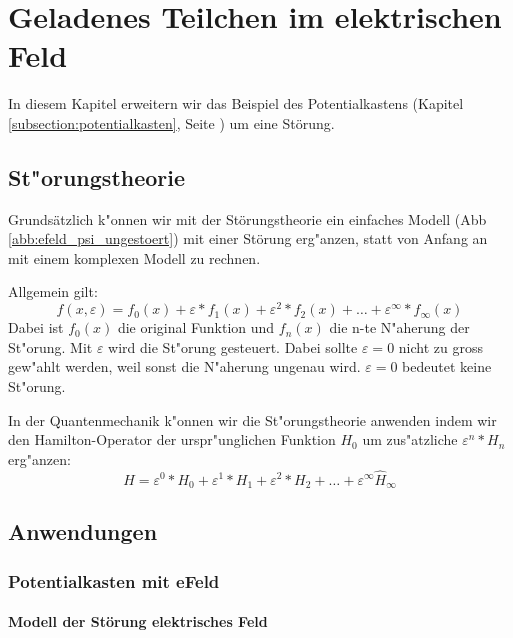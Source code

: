 \chapter{Geladenes Teilchen im elektrischen Feld\label{chapter:efeld}}
\begin{refsection}


In diesem Kapitel erweitern wir das Beispiel des Potentialkastens 
(Kapitel \ref{subsection:potentialkasten}, Seite \pageref{subsection:potentialkasten})
um eine St\"orung.

\section{ St"orungstheorie }
Grundsätzlich k"onnen wir mit der St\"orungstheorie ein einfaches Modell (Abb \ref{abb:efeld_psi_ungestoert}) mit einer St\"orung erg"anzen, statt von Anfang an mit einem komplexen Modell zu rechnen.

Allgemein gilt:
\[
  f(x, \varepsilon) = f_0(x) + \varepsilon*f_1(x) + \varepsilon^2*f_2(x) + \ldots + \varepsilon^\infty*f_\infty(x)
\]
Dabei ist $f_0(x)$ die original Funktion und $f_n(x)$ die n-te  N"aherung der St"orung.
Mit $\varepsilon$ wird die St"orung gesteuert. Dabei sollte $\varepsilon = 0$ nicht zu gross gew"ahlt werden, weil sonst die N"aherung ungenau wird. $\varepsilon = 0$ bedeutet keine St"orung.

In der Quantenmechanik k"onnen wir die St"orungstheorie anwenden indem wir den Hamilton-Operator der urspr"unglichen Funktion $H_0$ um zus"atzliche $\varepsilon^n*H_n$ erg"anzen:
\[
  H = \varepsilon^0*H_0 + \varepsilon^1*H_1 + \varepsilon^2*H_2 + \ldots + \varepsilon^\infty \hat H_\infty
\]












\section{ Anwendungen }

\subsection{ Potentialkasten mit eFeld }


\subsubsection{ Modell der St\"orung elektrisches Feld }


\end{refsection}
